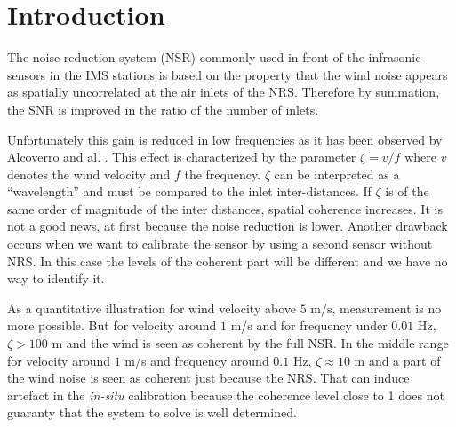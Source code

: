 %
%


\clearpage
\section{Introduction}
The noise reduction system (NSR) commonly used in front of the infrasonic sensors in the IMS stations is based on the property that the wind noise appears as spatially uncorrelated at the air inlets of the NRS. Therefore by summation, the SNR is improved in the ratio of the number of inlets. 

Unfortunately this gain is reduced in low frequencies as it has been observed by Alcoverro and al. \cite{alcoverro:2005}. This effect is characterized by the parameter $\zeta=v/f$ where $v$ denotes the wind velocity and $f$ the frequency. $\zeta$ can be interpreted as a ``wavelength'' and must be compared to the inlet inter-distances. If $\zeta$ is of the same order of magnitude of the inter distances, spatial coherence increases. It is not a good news, at first because the noise reduction  is lower. Another drawback occurs when we want to calibrate the sensor by using a second sensor without NRS. In this case the levels of the coherent part will be different and we have no way to identify it.

As a quantitative illustration for wind velocity above $5$ m/s, measurement is no more possible. But for velocity around $1$ m/s and for frequency under $0.01$ Hz, $\zeta>100$ m and the wind is seen as coherent by the full NSR. In the middle range for velocity around $1$ m/s and frequency around $0.1$ Hz, $\zeta\approx 10$ m and a part of the wind noise is seen as coherent just because the NRS. That can induce artefact in the {\it in-situ} calibration because the coherence level close to 1 does not guaranty that the system to solve is well determined.


